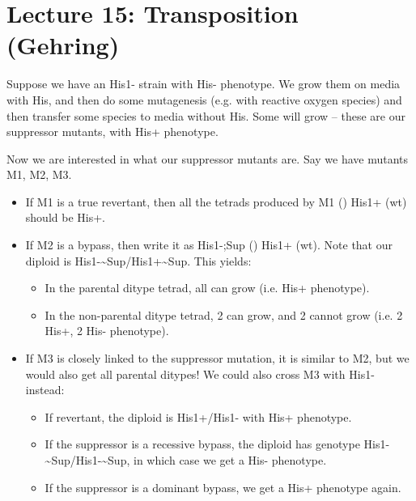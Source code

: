 \section*{Lecture 15: Transposition (Gehring)}
\setcounter{section}{15}

\begin{exper}
	Suppose we have an  His1- strain with His- phenotype. 
	We grow them on media with His, and then do some mutagenesis (e.g. with reactive oxygen species) and then transfer some species to media without His.
	Some will grow -- these are our suppressor mutants, with His+ phenotype.
\end{exper}

\begin{exper}
	Now we are interested in what our suppressor mutants are. Say we have mutants M1, M2, M3.
	\begin{itemize}
		\item If M1 is a true revertant, then all the tetrads produced by M1 (\x) His1+ (wt) should be His+.
		\item If M2 is a bypass, then write it as His1-;Sup (\x) His1+ (wt). Note that our diploid is His1-\sim Sup/His1+\sim Sup. This yields:
			\begin{itemize}
				\item In the parental ditype tetrad, all can grow (i.e. His+ phenotype).
				\item In the non-parental ditype tetrad, 2 can grow, and 2 cannot grow (i.e. 2 His+, 2 His- phenotype).
			\end{itemize}
		\item If M3 is closely linked to the suppressor mutation, it is similar to M2, but we would also get all parental ditypes! 
			We could also cross M3 with His1- instead:
			\begin{itemize}
				\item If revertant, the diploid is His1+/His1- with His+ phenotype.
				\item If the suppressor is a recessive bypass, the diploid has genotype His1-\sim Sup/His1-\sim Sup, in which case we get a His- phenotype.
				\item If the suppressor is a dominant bypass, we get a His+ phenotype again.
			\end{itemize}
	\end{itemize}
\end{exper}

